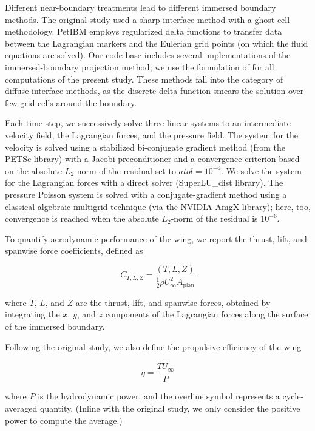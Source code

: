 Different near-boundary treatments lead to different immersed boundary methods.
The original study used a sharp-interface method with a ghost-cell methodology.\supercite{mittal_et_al_2008}
PetIBM employs regularized delta functions to transfer data between the Lagrangian markers and the Eulerian grid points (on which the fluid equations are solved).
Our code base includes several implementations of the immersed-boundary projection method\supercite{taira_colonius_2007}; we use the formulation of \citet{li_et_al_2016} for all computations of the present study.
These methods fall into the category of diffuse-interface methods, as the discrete delta function smears the solution over few grid cells around the boundary.

Each time step, we successively solve three linear systems to an intermediate velocity field, the Lagrangian forces, and the pressure field.
The system for the velocity is solved using a stabilized bi-conjugate gradient method (from the PETSc library) with a Jacobi preconditioner and a convergence criterion based on the absolute $L_2$-norm of the residual set to $atol = 10^{-6}$.
We solve the system for the Lagrangian forces with a direct solver (SuperLU\_dist library).
The pressure Poisson system is solved with a conjugate-gradient method using a classical algebraic multigrid technique (via the NVIDIA AmgX library); here, too, convergence is reached when the absolute $L_2$-norm of the residual is $10^{-6}$.

To quantify aerodynamic performance of the wing, we report the thrust, lift, and spanwise force coefficients, defined as

\begin{equation}
  C_{T, L, Z} = \frac{\left( T, L, Z \right)}{\frac{1}{2} \rho U_\infty^2 A_\text{plan}}
\end{equation}

where $T$, $L$, and $Z$ are the thrust, lift, and spanwise forces, obtained by integrating the $x$, $y$, and $z$ components of the Lagrangian forces along the surface of the immersed boundary.

Following the original study, we also define the propulsive efficiency of the wing

\begin{equation}
  \eta = \frac{\overline{T} U_\infty}{\overline{P}}
\end{equation}

where $P$ is the hydrodynamic power, and the overline symbol represents a cycle-averaged quantity.
(Inline with the original study, we only consider the positive power to compute the average.)


